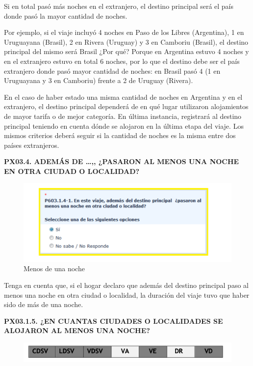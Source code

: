 \documentclass[
  openany]{book}
\begin{document}
Si en total pasó más noches en el extranjero, el destino principal será el país donde pasó la mayor cantidad de noches.

Por ejemplo, si el viaje incluyó 4 noches en Paso de los Libres (Argentina), 1 en Uruguayana (Brasil), 2 en Rivera (Uruguay) y 3 en Camboriu (Brasil), el destino principal del mismo será Brasil ¿Por qué? Porque en Argentina estuvo 4 noches y en el extranjero estuvo en total 6 noches, por lo que el destino debe ser el país extranjero donde pasó mayor cantidad de noches: en Brasil pasó 4 (1 en Uruguayana y 3 en Camboriu) frente a 2 de Uruguay (Rivera).

En el caso de haber estado una misma cantidad de noches en Argentina y en el extranjero, el destino principal dependerá de en qué lugar utilizaron alojamientos de mayor tarifa o de mejor categoría. En última instancia, registrará al destino principal teniendo en cuenta dónde se alojaron en la última etapa del viaje. Los mismos criterios deberá seguir si la cantidad de noches es la misma entre dos países extranjeros.

\textbf{PX03.4. ADEMÁS DE \ldots,, ¿PASARON AL MENOS UNA NOCHE EN OTRA CIUDAD O LOCALIDAD?}

\begin{figure}

{\centering \includegraphics[width=1\linewidth]{imagenes/figura6-83} 

}

\caption{Menos de una noche}\label{fig:menosdeuna}
\end{figure}

Tenga en cuenta que, si el hogar declaro que además del destino principal paso al menos una noche en otra ciudad o localidad, la duración del viaje tuvo que haber sido de más de una noche.

\textbf{PX03.1.5. ¿EN CUANTAS CIUDADES O LOCALIDADES SE ALOJARON AL MENOS UNA NOCHE?}

\begin{figure}

{\centering \includegraphics[width=1\linewidth]{imagenes/figura6-84} 

}

\end{figure}
\end{document}
